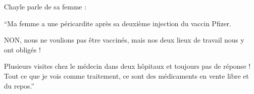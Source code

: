 Chayle parle de sa femme :

“Ma femme a une péricardite après sa deuxième injection du vaccin Pfizer.

NON, nous ne voulions pas être vaccinés, mais nos deux lieux de travail nous y
ont obligés !

Plusieurs visites chez le médecin dans deux hôpitaux et toujours pas de réponse
! Tout ce que je vois comme traitement, ce sont des médicaments en vente libre
et du repos.”

